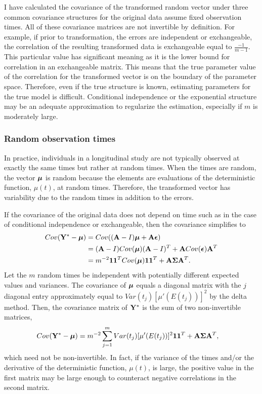 I have calculated the covariance of the transformed random vector under three common covariance structures for the original data assume fixed observation times. All of these covariance matrices are not invertible by definition. For example, if prior to transformation, the errors are independent or exchangeable, the correlation of the resulting transformed data is exchangeable equal to $\frac{-1}{m-1}$. This particular value has significant meaning as it is the lower bound for correlation in an exchangeable matrix. This means that the true parameter value of the correlation for the transformed vector is on the boundary of the parameter space. Therefore, even if the true structure is known, estimating parameters for the true model is difficult. Conditional independence or the exponential structure may be an adequate approximation to regularize the estimation, especially if $m$ is moderately large.

\subsubsection{Random observation times} 
In practice, individuals in a longitudinal study are not typically observed at exactly the same times but rather at random times. When the times are random, the vector $\boldsymbol\mu$ is random because the elements are evaluations of the deterministic function, $\mu(t)$, at random times. Therefore, the transformed vector has variability due to the random times in addition to the errors. 

If the covariance of the original data does not depend on time such as in the case of conditional independence or exchangeable, then the covariance simplifies to
\begin{align*}
Cov(\mathbf Y^{*} - \boldsymbol\mu) &= Cov((\mathbf A-I)\boldsymbol\mu + \mathbf A \boldsymbol\epsilon)\\
&=(\mathbf A-I) Cov(\boldsymbol\mu)(\mathbf A-I)^{T} + \mathbf A Cov(\boldsymbol\epsilon)\mathbf A^{T}\\
&=m^{-2}\mathbf 1\mathbf 1^{T} Cov(\boldsymbol\mu)\mathbf 1\mathbf 1^{T} + \mathbf A\boldsymbol\Sigma\mathbf A^{T}.
\end{align*}
Let the $m$ random times be independent with potentially different expected values and variances. The covariance of $\boldsymbol\mu$ equals a diagonal matrix with the $j$ diagonal entry approximately equal to $Var(t_{j})[\mu'(E(t_{j}))]^{2}$ by the delta method. Then, the covariance matrix of $\mathbf Y^{*}$ is the sum of two non-invertible matrices,
\begin{align*}
Cov(\mathbf Y^{*} - \boldsymbol\mu) &=m^{-2}\sum^{m}_{j=1}Var(t_{j})[\mu'(E(t_{j}))]^{2} \mathbf 1\mathbf 1^{T}  + \mathbf A\boldsymbol\Sigma\mathbf A^{T},
\end{align*}
which need not be non-invertible. In fact, if the variance of the times and/or the derivative of the deterministic function, $\mu(t)$, is large, the positive value in the first matrix may be large enough to counteract negative correlations in the second matrix. 


